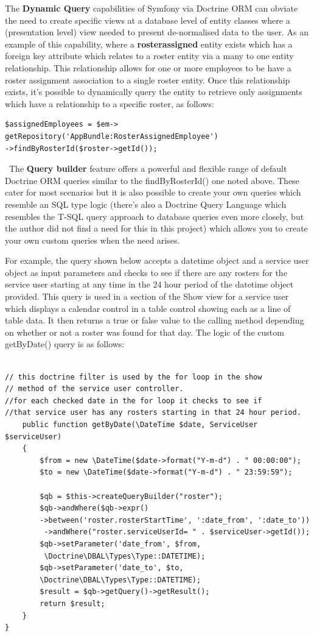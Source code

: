 \documentclass[a4paper,Times New Roman 11pt]{article}
\begin{document}
The \textbf{Dynamic Query} capabilities of Symfony via Doctrine ORM can obviate the need to create specific views at a database level of entity classes where a (presentation level) view needed to present de-normalised data to the user. As an example of this capability, where a \textbf{rosterassigned} entity exists which has a foreign key attribute which relates to a roster entity via a many to one entity relationship. This relationship allows for one or more employees to be have a roster assignment association to a single roster entity. Once this relationship exists, it's possible to dynamically query the entity to retrieve only assignments which have a relationship to a specific roster, as follows:

\begin{verbatim}$assignedEmployees = $em->
getRepository('AppBundle:RosterAssignedEmployee')
->findByRosterId($roster->getId());
\end{verbatim}
\
The \textbf{Query builder} feature offers a powerful and flexible range of default Doctrine ORM queries similar to the findByRosterId() one noted above. These cater for most scenarios but it is also possible to create your own queries which resemble an SQL type logic (there's also a Doctrine Query Language which resembles the T-SQL query approach to database queries even more closely, but the author did not find a need for this in this project) which allows you to create your own custom queries when the need arises. 

For example, the query shown below accepts a datetime object and a service user object as input parameters and checks to see if there are any rosters for the service user starting at any time in the 24 hour period of the datetime object provided. This query is used in a section of the Show view for a service user which displays a calendar control in a table control showing each as a line of table data. It then returns a true or false value to the calling method depending on whether or not a roster was found for that day.
The logic of the custom getByDate() query is as follows:
\begin{verbatim}
     
// this doctrine filter is used by the for loop in the show
// method of the service user controller.
//for each checked date in the for loop it checks to see if 
//that service user has any rosters starting in that 24 hour period.
    public function getByDate(\DateTime $date, ServiceUser $serviceUser)
    {
        $from = new \DateTime($date->format("Y-m-d") . " 00:00:00");
        $to = new \DateTime($date->format("Y-m-d") . " 23:59:59");
       
        $qb = $this->createQueryBuilder("roster");
        $qb->andWhere($qb->expr()
        ->between('roster.rosterStartTime', ':date_from', ':date_to'))
         ->andWhere("roster.serviceUserId= " . $serviceUser->getId());
        $qb->setParameter('date_from', $from,
         \Doctrine\DBAL\Types\Type::DATETIME);
        $qb->setParameter('date_to', $to, 
        \Doctrine\DBAL\Types\Type::DATETIME);
        $result = $qb->getQuery()->getResult();
        return $result;
    }
}  
\end{verbatim}
\end{document}
